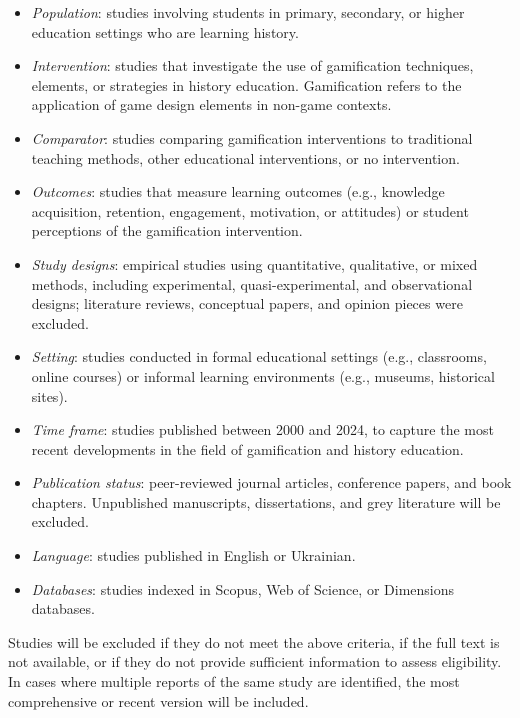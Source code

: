 \documentclass[a4paper,fleqn]{cas-sc}
\begin{document}
\begin{itemize}[noitemsep]
 \item \textit{Population}: studies involving students in primary, secondary, or higher education settings who are learning history.
 \item \textit{Intervention}: studies that investigate the use of gamification techniques, elements, or strategies in history education. Gamification refers to the application of game design elements in non-game contexts.
 \item \textit{Comparator}: studies comparing gamification interventions to traditional teaching methods, other educational interventions, or no intervention.
 \item \textit{Outcomes}: studies that measure learning outcomes (e.g., knowledge acquisition, retention, engagement, motivation, or attitudes) or student perceptions of the gamification intervention.
 \item \textit{Study designs}: empirical studies using quantitative, qualitative, or mixed methods, including experimental, quasi-experimental, and observational designs; literature reviews, conceptual papers, and opinion pieces were excluded.
 \item \textit{Setting}: studies conducted in formal educational settings (e.g., classrooms, online courses) or informal learning environments (e.g., museums, historical sites).
 \item \textit{Time frame}: studies published between 2000 and 2024, to capture the most recent developments in the field of gamification and history education.
 \item \textit{Publication status}: peer-reviewed journal articles, conference papers, and book chapters. Unpublished manuscripts, dissertations, and grey literature will be excluded.
 \item \textit{Language}: studies published in English or Ukrainian.
 \item \textit{Databases}: studies indexed in Scopus, Web of Science, or Dimensions databases.
\end{itemize}

Studies will be excluded if they do not meet the above criteria, if the full text is not available, or if they do not provide sufficient information to assess eligibility. In cases where multiple reports of the same study are identified, the most comprehensive or recent version will be included.
%
%
%
%
%
%
%
%
%
%
%
\end{document}

